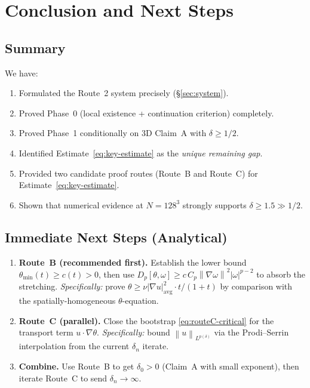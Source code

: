 \documentclass[11pt]{article}
\theoremstyle{definition}
\theoremstyle{remark}
\newcommand{\norm}[1]{\left\|#1\right\|}
\newcommand{\grad}{\nabla}
\begin{document}
\section{Conclusion and Next Steps}
\label{sec:conclusion}

\subsection{Summary}

We have:
\begin{enumerate}
\item Formulated the Route~2 system precisely (§\ref{sec:system}).
\item Proved Phase~0 (local existence + continuation criterion) completely.
\item Proved Phase~1 conditionally on 3D Claim~A with $\delta\geq 1/2$.
\item Identified Estimate~\eqref{eq:key-estimate} as the \emph{unique remaining gap}.
\item Provided two candidate proof routes (Route~B and Route~C) for
  Estimate~\eqref{eq:key-estimate}.
\item Shown that numerical evidence at $N=128^3$ strongly supports $\delta\geq 1.5\gg 1/2$.
\end{enumerate}

\subsection{Immediate Next Steps (Analytical)}

\begin{enumerate}
\item \textbf{Route~B (recommended first).}
  Establish the lower bound $\theta_{\min}(t)\geq c(t)>0$, then use
  $D_p[\theta,\omega]\geq c\,C_p\norm{\grad\omega}^2|\omega|^{p-2}$ to
  absorb the stretching.
  \emph{Specifically:} prove $\theta\geq\nu|\grad u|^2_{\mathrm{avg}}\cdot t/(1+t)$
  by comparison with the spatially-homogeneous $\theta$-equation.

\item \textbf{Route~C (parallel).}
  Close the bootstrap \eqref{eq:routeC-critical} for the transport term
  $u\cdot\grad\theta$.  \emph{Specifically:} bound $\norm{u}_{L^{p(\delta)}}$
  via the Prodi--Serrin interpolation from the current $\delta_n$ iterate.

\item \textbf{Combine.}
  Use Route~B to get $\delta_0>0$ (Claim~A with small exponent),
  then iterate Route~C to send $\delta_n\to\infty$.
\end{enumerate}
\end{document}
